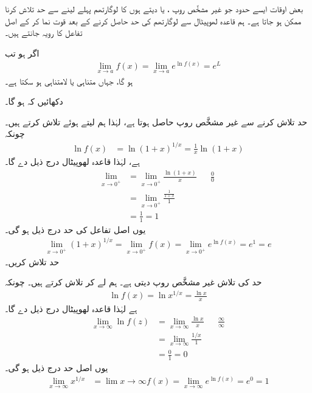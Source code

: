 بعض اوقات ایسے حدود  جو غیر مشخَّص روپ ،  یا  دیتے ہوں  کا لوگارتھم پہلے لینے سے حد تلاش کرنا ممکن ہو جاتا ہے۔ ہم  قاعدہ لھوپیٹال سے لوگارتھم کی حد حاصل کرنے کے بعد قوت نما  کر کے  اصل تفاعل کا رویہ جانتے ہیں۔

اگر  ہو تب
\begin{align*}
\lim_{x\to a}f(x)=\lim_{x\to a}e^{\ln f(x)}=e^L
\end{align*}
ہو گا، جہاں  متناہی یا لامتناہی ہو سکتا ہے۔ 

دکھائیں  کہ  ہو گا۔

حد تلاش کرنے سے غیر مشخَّص روپ  حاصل ہوتا ہے، لہٰذا ہم  لیتے ہوئے  تلاش کرتے ہیں۔ چونکہ
\begin{align*}
\ln f(x)&=\ln(1+x)^{1/x}=\frac{1}{x}\ln(1+x)
\end{align*}
ہے،  لہٰذا قاعدہ لھوپیٹال درج ذیل دے گا۔
\begin{align*}
\lim_{x\to 0^+}&=\lim_{x\to 0^+}\frac{\ln(1+x)}{x}&&\tfrac{0}{0}\\
&=\lim_{x\to 0^+}\frac{\tfrac{1}{1+x}}{1}\\
&=\frac{1}{1}=1
\end{align*}
یوں اصل تفاعل کی حد درج ذیل ہو گی۔
\begin{align*}
\lim_{x\to 0^+}(1+x)^{1/x}=\lim_{x\to0^+}f(x)=\lim_{x\to 0^+}e^{\ln f(x)}=e^1=e
\end{align*}
حد  تلاش کریں۔

حد کی تلاش غیر مشخَّص روپ  دیتی ہے۔ ہم  لے کر  تلاش کرتے ہیں۔ چونکہ
\begin{align*}
\ln f(x)=\ln x^{1/x}=\frac{\ln x}{x}
\end{align*}
ہے لہٰذا قاعدہ لھوپیٹال درج ذیل دے گا۔
\begin{align*}
\lim_{x\to\infty}\ln f(z)&=\lim_{x\to\infty}\frac{\ln x}{x}&&\tfrac{\infty}{\infty}\\
&=\lim_{x\to\infty}\frac{1/x}{1}\\
&=\frac{0}{1}=0
\end{align*}
یوں اصل حد درج ذیل ہو گی۔
\begin{align*}
\lim_{x\to\infty}x^{1/x}&=\lim{x\to\infty}f(x)=\lim_{x\to\infty}e^{\ln f(x)}=e^0=1
\end{align*}



